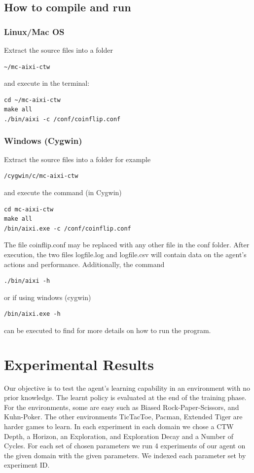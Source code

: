 \documentclass{article}
\theoremstyle{definition}
\newtheorem{primary statistics}[definition]{Primary Statistics}
\newtheorem{auxiliary statistics}[definition]{Auxiliary Statistics}
\begin{document}
\subsection{How to compile and run}
\subsubsection*{Linux/Mac OS}
Extract the source files into a folder 
\begin{lstlisting}[style=DOS]
 ~/mc-aixi-ctw 
\end{lstlisting}
 and execute in the terminal:
 
\begin{lstlisting}[style=DOS]
cd ~/mc-aixi-ctw
make all
./bin/aixi -c /conf/coinflip.conf
\end{lstlisting}

\subsubsection*{Windows (Cygwin)}
Extract the source files into a folder for example
\begin{lstlisting}[style=DOS]
 /cygwin/c/mc-aixi-ctw 
\end{lstlisting}
and execute the command (in Cygwin)
\begin{lstlisting}[style=DOS]
cd mc-aixi-ctw
make all
/bin/aixi.exe -c /conf/coinflip.conf
\end{lstlisting} 

The file coinflip.conf may be replaced with any other file in the conf folder. 
After execution, the two files logfile.log and logfile.csv will contain data on the agent’s actions and performance. Additionally, the command
\begin{lstlisting}[style=DOS]
./bin/aixi -h
\end{lstlisting}
or if using windows (cygwin)
\begin{lstlisting}[style=DOS]
/bin/aixi.exe -h
\end{lstlisting}
can be executed to find for more details on how to run the program.




\section{Experimental Results}

Our objective is to test the agent's learning capability in an environment with no prior knowledge. The learnt policy is evaluated at the end of the training phase. For the environments, some are easy such as Biased Rock-Paper-Scissors, and Kuhn-Poker. The other environments TicTacToe, Pacman, Extended Tiger are harder games to learn. In each experiment in each domain we chose a CTW Depth, a Horizon, an Exploration, and Exploration Decay and a Number of Cycles. For each set of chosen parameters we run 4 experiments of our agent on the given domain with the given parameters. We indexed each parameter set by experiment ID. \\
\end{document}

